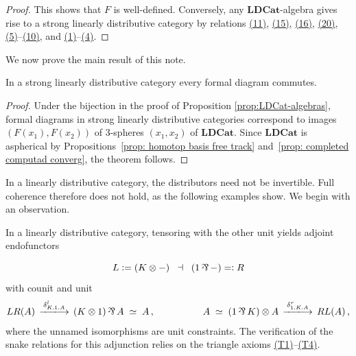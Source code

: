 \documentclass[reqno,12pt]{amsart}
\begin{document}
\begin{proof}
	\smallskip
	
	This shows that $F$ is well-defined. Conversely, any $\mathbf{LDCat}$-algebra gives rise to a strong linearly distributive category by relations \hyperref[Crit11]{(11)}, \hyperref[Crit15]{(15)}, \hyperref[Crit16]{(16)}, \hyperref[Crit20]{(20)}, \hyperref[Crit5]{(5)}–\hyperref[Crit10]{(10)}, and \hyperref[Crit1]{(1)}–\hyperref[Crit4]{(4)}.
\end{proof}

We now prove the main result of this note.

\begin{theorem}\label{thm:main theorem}
In a strong linearly distributive category every formal diagram commutes.
\end{theorem}

\begin{proof}
Under the bijection in the proof of Proposition \ref{prop:LDCat-algebras}, formal diagrams in strong linearly distributive categories correspond to images $(F(x_1),F(x_2))$ of $3$-spheres $(x_1,x_2)$ of $\mathbf{LDCat}$. Since $\mathbf{LDCat}$ is aspherical by Propositions~\ref{prop: homotop basis free track} and~\ref{prop: completed computad converg}, the theorem follows.
\end{proof}

In a linearly distributive category, the distributors need not be invertible. Full coherence therefore does not hold, as the following examples show. We begin with an observation.

\begin{remark}\label{rem:adj}
In a linearly distributive category, tensoring with the other unit yields adjoint endofunctors 

\begin{equation*}\label{eq:adjunction-L-R}
	L:= (K \ot -) \;\; \dashv \;\; (1 \partimes -)=:R
\end{equation*}
with counit and unit
\begin{align*}
	LR(A) \sxlongrightarrow{\distl_{K,1,A}} {(K \ot 1)} \partimes A \Simeq A\,,
	\qquad \quad \qquad
	A \Simeq (1 \partimes K)\ot A \sxlongrightarrow{\distr_{1,K,A}} RL(A)\,,
\end{align*}
where the unnamed isomorphisms are unit constraints. The verification of the snake relations for this adjunction relies on the triangle axioms \hyperref[eq:T1]{(T1)}–\hyperref[eq:T4]{(T4)}.
\end{remark}
\end{document}
